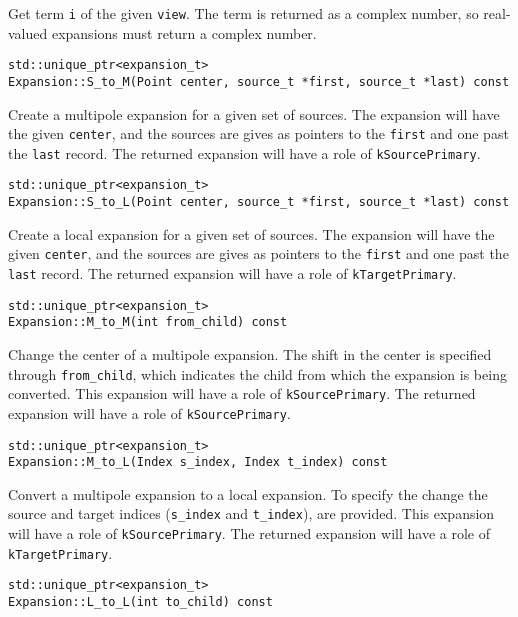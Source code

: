 \noindent Get term \texttt{i} of the given \texttt{view}. The term is returned
as a complex number, so real-valued expansions must return a complex number.

\begin{lstlisting}
std::unique_ptr<expansion_t>
Expansion::S_to_M(Point center, source_t *first, source_t *last) const
\end{lstlisting}

\noindent Create a multipole expansion for a given set of sources. The
expansion will have the given \texttt{center}, and the sources are gives as
pointers to the \texttt{first} and one past the \texttt{last} record.
The returned expansion will have a role of \texttt{kSourcePrimary}.

\begin{lstlisting}
std::unique_ptr<expansion_t>
Expansion::S_to_L(Point center, source_t *first, source_t *last) const
\end{lstlisting}

\noindent Create a local expansion for a given set of sources. The expansion
will have the given \texttt{center}, and the sources are gives as pointers to
the \texttt{first} and one past the \texttt{last} record.
The returned expansion will have a role of \texttt{kTargetPrimary}.

\begin{lstlisting}
std::unique_ptr<expansion_t>
Expansion::M_to_M(int from_child) const
\end{lstlisting}

\noindent Change the center of a multipole expansion. The shift in the center
is specified through \texttt{from\_child}, which indicates the child from which
the expansion is being converted.
This expansion will have a role of \texttt{kSourcePrimary}.
The returned expansion will have a role of \texttt{kSourcePrimary}.

\begin{lstlisting}
std::unique_ptr<expansion_t>
Expansion::M_to_L(Index s_index, Index t_index) const
\end{lstlisting}

\noindent Convert a multipole expansion to a local expansion. To specify the
change the source and target indices (\texttt{s\_index} and \texttt{t\_index}),
are provided.
This expansion will have a role of \texttt{kSourcePrimary}.
The returned expansion will have a role of \texttt{kTargetPrimary}.

\begin{lstlisting}
std::unique_ptr<expansion_t>
Expansion::L_to_L(int to_child) const
\end{lstlisting}

